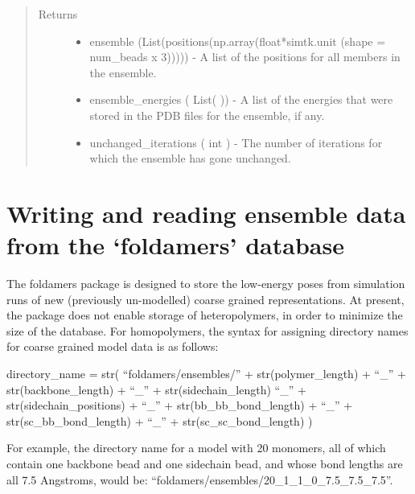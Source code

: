 \documentclass[letterpaper,12pt,english,openany,oneside]{sphinxmanual}
\begin{document}
\begin{fulllineitems}
\begin{quote}
\begin{description}
\begin{itemize}
\end{itemize}

\item[{Returns}] \leavevmode
\begin{itemize}
\item {} 
ensemble (List(positions(np.array(float*simtk.unit (shape = num\_beads x 3))))) - A list of the positions for all members in the ensemble.

\item {} 
ensemble\_energies ( List( )) - A list of the energies that were stored in the PDB files for the ensemble, if any.

\item {} 
unchanged\_iterations ( int ) - The number of iterations for which the ensemble has gone unchanged.

\end{itemize}


\end{description}\end{quote}

\end{fulllineitems}



\section{Writing and reading ensemble data from the ‘foldamers’ database}
\label{\detokenize{ensembles:writing-and-reading-ensemble-data-from-the-foldamers-database}}
The foldamers package is designed to store the low-energy poses from simulation runs of new (previously un-modelled) coarse grained representations.  At present, the package does not enable storage of heteropolymers, in order to minimize the size of the database.  For homopolymers, the syntax for assigning directory names for coarse grained model data is as follows:

directory\_name = str( “foldamers/ensembles/” + str(polymer\_length) + “\_” + str(backbone\_length) + “\_” + str(sidechain\_length) “\_” + str(sidechain\_positions) + “\_” + str(bb\_bb\_bond\_length) + “\_” + str(sc\_bb\_bond\_length) + “\_” + str(sc\_sc\_bond\_length) )

For example, the directory name for a model with 20 monomers, all of which contain one backbone bead and one sidechain bead, and whose bond lengths are all 7.5 Angstroms, would be: “foldamers/ensembles/20\_1\_1\_0\_7.5\_7.5\_7.5”.
\end{document}
